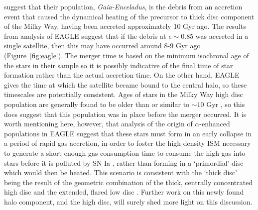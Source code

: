 \citet{2018arXiv180606038H} suggest that their population,
\emph{Gaia-Enceladus}, is the debris from an accretion event that
caused the dynamical heating of the precursor to thick disc component
of the Milky Way, having been accreted approximately 10 Gyr ago.
The results from analysis of EAGLE suggest that if the debris at
$e \sim 0.85$ was accreted in a single satellite, then this may
have occurred around 8-9 Gyr ago (Figure~\ref{fig:eagle}).
The \citet{2018arXiv180606038H} merger time is based on the minimum
isochronal age of the stars in their sample so it is possibly indicative
of the final time of star formation rather than the actual accretion time.  On the other hand, EAGLE gives
the time at which the satellite became bound to the central halo,
so these timescales are potentially consistent.  Ages of stars in
the Milky Way high \afe{} disc population are generally found to
be older than or similar to $\sim 10$ Gyr
\citep[e.g.][]{2013A&A...560A.109H,2016MNRAS.456.3655M,2017arXiv170600018M},
so this does suggest that this population was in place before the
merger occurred. It is worth mentioning here, however, that analysis
of the origin of $\alpha$-enhanced populations in EAGLE suggest
that these stars must form in an early collapse in a period of rapid
gas accretion, in order to foster the high density ISM necessary
to generate a short enough gas consumption time to consume the high
\afe{} gas into stars before it is polluted by SN Ia \citep{2018MNRAS.477.5072M}, rather than forming in a
`primordial' disc which would then be heated. This scenario is
consistent with the `thick disc' being the result of the geometric
combination of the thick, centrally concentrated high \afe{} disc
and the extended, flared low \afe{} disc
\citep[e.g][]{2017arXiv170600018M,2016arXiv160901168M,2015ApJ...804L...9M}.
Further work on this newly found halo component, and the high \afe{}
disc, will surely shed more light on this discussion.







%
